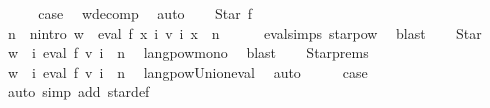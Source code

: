 \begin{isabellebody}
\ \ \isamarkupfalse%
\ \isamarkupfalse%
\ {\isacharquery}{\kern0pt}case\ \isamarkupfalse%
\ w{\isacharunderscore}{\kern0pt}decomp\ \isamarkupfalse%
\ auto\isanewline
{}\isamarkupfalse%
\isanewline
\ \ \isamarkupfalse%
\ {\isacharparenleft}{\kern0pt}Star\ f{\isacharparenright}{\kern0pt}\isanewline
\ \ \isamarkupfalse%
\ \isamarkupfalse%
\ n\ \ n{\isacharunderscore}{\kern0pt}intro{\isacharcolon}{\kern0pt}\ {\isachardoublequoteopen}w\ {\isasymin}\ {\isacharparenleft}{\kern0pt}eval\ f\ {\isacharparenleft}{\kern0pt}{\isasymlambda}x{\isachardot}{\kern0pt}\ {\isasymUnion}i{\isachardot}{\kern0pt}\ v\ i\ x{\isacharparenright}{\kern0pt}{\isacharparenright}{\kern0pt}\ {\isacharcircum}{\kern0pt}{\isacharcircum}{\kern0pt}\ n{\isachardoublequoteclose}\isanewline
\ \ \ \ \isamarkupfalse%
\ eval{\isachardot}{\kern0pt}simps{\isacharparenleft}{\kern0pt}{}{\isacharparenright}{\kern0pt}\ star{\isacharunderscore}{\kern0pt}pow\ \isamarkupfalse%
\ blast\isanewline
\ \ \isamarkupfalse%
\ Star\ \isamarkupfalse%
\ {\isachardoublequoteopen}w\ {\isasymin}\ {\isacharparenleft}{\kern0pt}{\isasymUnion}i{\isachardot}{\kern0pt}\ eval\ f\ {\isacharparenleft}{\kern0pt}v\ i{\isacharparenright}{\kern0pt}{\isacharparenright}{\kern0pt}\ {\isacharcircum}{\kern0pt}{\isacharcircum}{\kern0pt}\ n{\isachardoublequoteclose}\ \isamarkupfalse%
\ langpow{\isacharunderscore}{\kern0pt}mono\ \isamarkupfalse%
\ blast\isanewline
\ \ \isamarkupfalse%
\ Star{\isachardot}{\kern0pt}prems\ \isamarkupfalse%
\ {\isachardoublequoteopen}w\ {\isasymin}\ {\isacharparenleft}{\kern0pt}{\isasymUnion}i{\isachardot}{\kern0pt}\ eval\ f\ {\isacharparenleft}{\kern0pt}v\ i{\isacharparenright}{\kern0pt}\ {\isacharcircum}{\kern0pt}{\isacharcircum}{\kern0pt}\ n{\isacharparenright}{\kern0pt}{\isachardoublequoteclose}\ \isamarkupfalse%
\ langpow{\isacharunderscore}{\kern0pt}Union{\isacharunderscore}{\kern0pt}eval\ \isamarkupfalse%
\ auto\isanewline
\ \ \isamarkupfalse%
\ \isamarkupfalse%
\ {\isacharquery}{\kern0pt}case\ \isamarkupfalse%
\ {\isacharparenleft}{\kern0pt}auto\ simp\ add{\isacharcolon}{\kern0pt}\ star{\isacharunderscore}{\kern0pt}def{\isacharparenright}{\kern0pt}\isanewline

\end{isabellebody}
